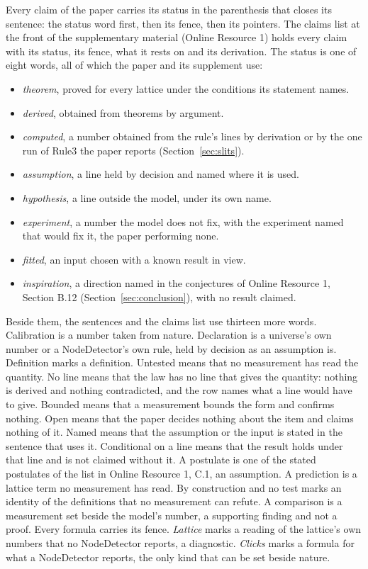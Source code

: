 \documentclass[pdflatex,sn-mathphys-num]{sn-jnl}
\theoremstyle{thmstyleone}
\theoremstyle{thmstyletwo}
\begin{document}
Every claim of the paper carries its status in the parenthesis that closes its sentence: the status word first, then its fence, then its pointers. The claims list at the front of the supplementary material (Online Resource 1) holds every claim with its status, its fence, what it rests on and its derivation. The status is one of eight words, all of which the paper and its supplement use:
\begin{itemize}
\item \emph{theorem}, proved for every lattice under the conditions its statement names.
\item \emph{derived}, obtained from theorems by argument.
\item \emph{computed}, a number obtained from the rule's lines by derivation or by the one run of Rule3 the paper reports (Section~\ref{sec:slits}).
\item \emph{assumption}, a line held by decision and named where it is used.
\item \emph{hypothesis}, a line outside the model, under its own name.
\item \emph{experiment}, a number the model does not fix, with the experiment named that would fix it, the paper performing none.
\item \emph{fitted}, an input chosen with a known result in view.
\item \emph{inspiration}, a direction named in the conjectures of Online Resource 1, Section B.12 (Section~\ref{sec:conclusion}), with no result claimed.
\end{itemize}
Beside them, the sentences and the claims list use thirteen more words. Calibration is a number taken from nature. Declaration is a universe's own number or a NodeDetector's own rule, held by decision as an assumption is. Definition marks a definition. Untested means that no measurement has read the quantity. No line means that the law has no line that gives the quantity: nothing is derived and nothing contradicted, and the row names what a line would have to give. Bounded means that a measurement bounds the form and confirms nothing. Open means that the paper decides nothing about the item and claims nothing of it. Named means that the assumption or the input is stated in the sentence that uses it. Conditional on a line means that the result holds under that line and is not claimed without it. A postulate is one of the stated postulates of the list in Online Resource 1, C.1, an assumption. A prediction is a lattice term no measurement has read. By construction and no test marks an identity of the definitions that no measurement can refute. A comparison is a measurement set beside the model's number, a supporting finding and not a proof. Every formula carries its fence. \emph{Lattice} marks a reading of the lattice's own numbers that no NodeDetector reports, a diagnostic. \emph{Clicks} marks a formula for what a NodeDetector reports, the only kind that can be set beside nature.
\end{document}
